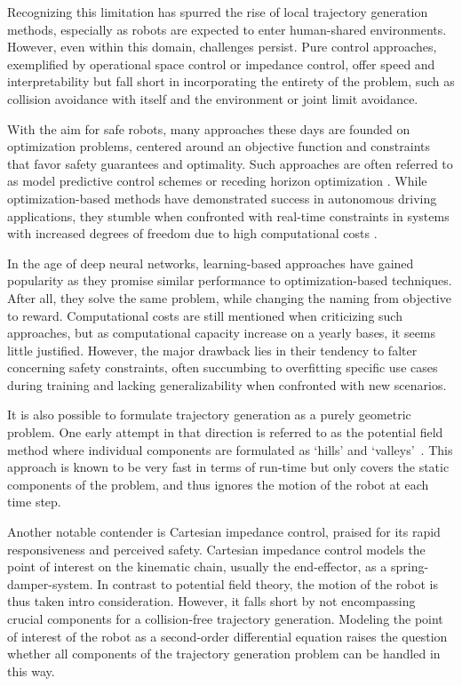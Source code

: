 Recognizing this limitation has spurred the rise of local
trajectory generation methods, especially as robots are
expected to enter human-shared environments. However, even
within this domain, challenges persist. Pure control
approaches, exemplified by operational space control or
impedance control, offer speed and interpretability but fall
short in incorporating the entirety of the problem, such as
collision avoidance with itself and the environment or
joint limit avoidance.

With the aim for safe robots, many approaches these days are
founded on optimization problems, centered around an
objective function and constraints that favor safety
guarantees and optimality. Such approaches are often
referred to as model predictive control schemes or receding
horizon optimization \cite{hewing2020learning}. While
optimization-based methods have demonstrated success in
autonomous driving applications, they stumble when
confronted with real-time constraints in systems with
increased degrees of freedom due to high computational costs
\cite{spahn2021coupled}.

In the age of deep neural networks, learning-based
approaches have gained popularity as they promise similar
performance to optimization-based techniques. After all,
they solve the same problem, while changing the naming from
objective to reward. Computational costs
are still mentioned when criticizing such approaches, but as
computational capacity increase on a yearly bases, it seems
little justified. However, the major drawback lies in their
tendency to falter concerning safety constraints, often
succumbing to overfitting specific use cases during training
and lacking generalizability when confronted with new
scenarios.


It is also possible to formulate trajectory generation as a
purely geometric problem. One early attempt in that
direction is referred to as the potential field method where
individual components are formulated as `hills' and
`valleys'~\cite{barraquand1992numerical,hwang1992potential}.
This approach is known to be very fast in terms of run-time
but only covers the static components of the problem, and
thus ignores the motion of the robot at each time step.

Another notable contender is Cartesian impedance control,
praised for its rapid responsiveness and perceived safety.
Cartesian impedance control models the point of interest on
the kinematic chain, usually the end-effector, as a
spring-damper-system. In contrast to potential field theory,
the motion of the robot is thus taken intro consideration.
However, it falls short by not encompassing crucial
components for a collision-free trajectory generation.
Modeling the point of interest of the robot as a
second-order differential equation raises the question
whether all components of the trajectory generation problem
can be handled in this way. 

